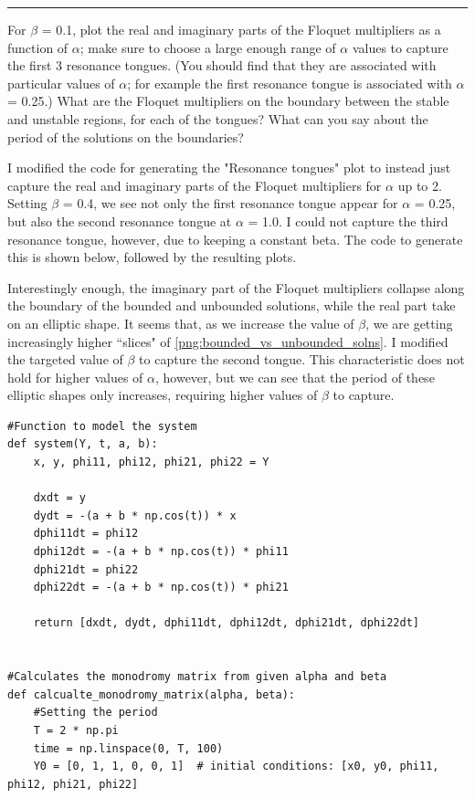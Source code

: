\documentclass[12pt]{article}
\newcommand{\jump}{\vspace{5mm}}
\begin{document}
\begin{enumerate}[]
\vspace{\floatsep}
\clearpage
\jump
\hrule
\jump

For $\beta$ = 0.1, plot the real and imaginary parts of the Floquet multipliers as a function of $\alpha$; make sure to choose a large enough range of $\alpha$ values to capture the first 3 resonance tongues. (You should find that they are associated with particular values of $\alpha$; for example the first resonance tongue is associated with $\alpha$ = 0.25.) What are the Floquet multipliers on the boundary between the stable and unstable regions, for each of the tongues? What can you say about the period of the solutions on the boundaries?

\jump
\begin{solution}
    
I modified the code for generating the "Resonance tongues" plot to instead just capture the real and imaginary parts of the Floquet multipliers for $\alpha$ up to 2. Setting $\beta$ = 0.4, we see not only the first resonance tongue appear for $\alpha$ = 0.25, but also the second resonance tongue at $\alpha$ = 1.0. I could not capture the third resonance tongue, however, due to keeping a constant beta. The code to generate this is shown below, followed by the resulting plots.

Interestingly enough, the imaginary part of the Floquet multipliers collapse along the boundary of the bounded and unbounded solutions, while the real part take on an elliptic shape. It seems that, as we increase the value of $\beta$, we are getting increasingly higher ``slices" of \ref{png:bounded_vs_unbounded_solns}. I modified the targeted value of $\beta$ to capture the second tongue. This characteristic does not hold for higher values of $\alpha$, however, but we can see that the period of these elliptic shapes only increases, requiring higher values of $\beta$ to capture. 

\end{solution}

\jump
\begin{lstlisting}
#Function to model the system
def system(Y, t, a, b):
    x, y, phi11, phi12, phi21, phi22 = Y

    dxdt = y
    dydt = -(a + b * np.cos(t)) * x
    dphi11dt = phi12
    dphi12dt = -(a + b * np.cos(t)) * phi11
    dphi21dt = phi22
    dphi22dt = -(a + b * np.cos(t)) * phi21

    return [dxdt, dydt, dphi11dt, dphi12dt, dphi21dt, dphi22dt]


#Calculates the monodromy matrix from given alpha and beta
def calcualte_monodromy_matrix(alpha, beta):
    #Setting the period
    T = 2 * np.pi
    time = np.linspace(0, T, 100)
    Y0 = [0, 1, 1, 0, 0, 1]  # initial conditions: [x0, y0, phi11, phi12, phi21, phi22]


\end{lstlisting}
\end{enumerate}
\end{document}
